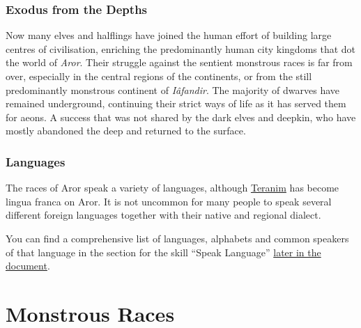 \subsubsection{Exodus from the Depths}
\label{sec:Exodus from the Depths}

Now many elves and halflings have joined the human effort of building large
centres of civilisation, enriching the predominantly human city kingdoms that
dot the world of \emph{Aror}. Their struggle against the sentient monstrous
races is far from over, especially in the central regions of the continents,
or from the still predominantly monstrous continent of \emph{Iâfandir}. The
majority of dwarves have remained underground, continuing their strict ways of
life as it has served them for aeons. A success that was not shared by the
dark elves and deepkin, who have mostly abandoned the deep and returned to the
surface.

\subsubsection{Languages}
\label{sec:Languages}

The races of Aror speak a variety of languages, although \hyperref[sec:Speak
Language]{Teranim} has become lingua franca on Aror. It is not uncommon for
many people to speak several different foreign languages together with their
native and regional dialect.

\begin{note}
  You can find a comprehensive list of languages, alphabets and common speakers
  of that language in the section for the skill ``Speak
  Language'' \hyperref[sec:Speak Language]{later in the document}.
\end{note}















\section{Monstrous Races}
\label{sec:Monstrous Races}


